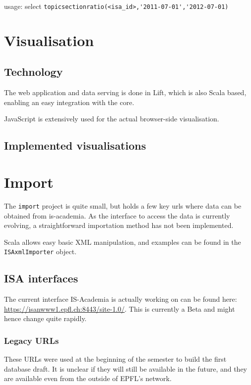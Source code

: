 usage: select \verb|topicsectionratio(<isa_id>,'2011-07-01','2012-07-01)|

\chapter{Visualisation}

\section{Technology}
The web application and data serving is done in Lift, which is also Scala based, enabling an easy integration with the core.

JavaScript is extensively used for the actual browser-side visualisation.

\section{Implemented visualisations}

\chapter{Import}
The \verb|import| project is quite small, but holds a few key urls where data can be obtained from is-academia. As the interface to access the data is currently evolving, a straightforward importation method has not been implemented.

Scala allows easy basic XML manipulation, and examples can be found in the \verb|ISAxmlImporter| object.

\section{ISA interfaces}
The current interface IS-Academia is actually working on can be found here: \url{https://isanwww1.epfl.ch:8443/site-1.0/}. This is currently a Beta and might hence change quite rapidly.

\subsection{Legacy URLs}
These URLs were used at the beginning of the semester to build the first database draft. It is unclear if they will still be available in the future, and they are available even from the outside of EPFL's network.

